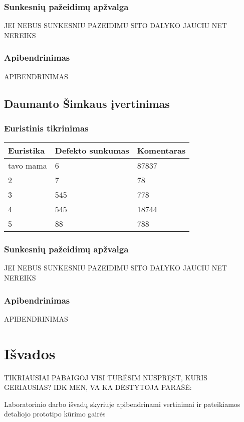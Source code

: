 \documentclass{VUMIFPSkursinis}
\begin{document}
\subsubsection{Sunkesnių pažeidimų apžvalga}
JEI NEBUS SUNKESNIU PAZEIDIMU SITO DALYKO JAUCIU NET NEREIKS

\subsubsection{Apibendrinimas}
APIBENDRINIMAS

\subsection{Daumanto Šimkaus įvertinimas}
\subsubsection{Euristinis tikrinimas}
\begin{center}
 \begin{tabular}{|| p{4cm} | p{4cm} | p{8cm} ||} 
 \hline
 Euristika & Defekto sunkumas & Komentaras \\
 \hline\hline
 tavo mama & 6 & 87837 \\ 
 \hline
 2 & 7 & 78 \\
 \hline
 3 & 545 & 778 \\
 \hline
 4 & 545 & 18744 \\
 \hline
 5 & 88 & 788 \\  %
 \hline                 %
\end{tabular}	
\end{center}

\subsubsection{Sunkesnių pažeidimų apžvalga}
JEI NEBUS SUNKESNIU PAZEIDIMU SITO DALYKO JAUCIU NET NEREIKS

\subsubsection{Apibendrinimas}
APIBENDRINIMAS


\section{Išvados}
TIKRIAUSIAI PABAIGOJ VISI TURĖSIM NUSPRĘST, KURIS GERIAUSIAS? IDK MEN, VA KA DĖSTYTOJA PARAŠĖ:

Laboratorinio darbo išvadų skyriuje apibendrinami vertinimai ir pateikiamos detaliojo prototipo kūrimo gairės


















\printbibliography[heading=bibintoc, title=Šaltiniai]  %
\end{document}
